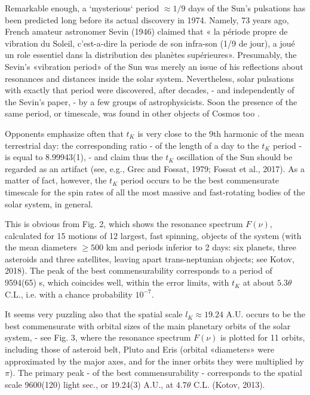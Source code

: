 \documentclass[twoside,draft]{article}
\begin{document}
\begin{sloppypar}
Remarkable enough, a `mysterious` period $\approx 1/9$ days of the Sun's pulsations has been predicted
long before its actual discovery in 1974. Namely, 73 years ago, French amateur astronomer Sevin
(1946) claimed that « la p\'{e}riode propre de vibration du Soleil, c'est-a-dire la periode de son infra-son (1/9 de jour), a jou\'{e} un role essentiel dans la distribution des plan\`{e}tes sup\'{e}rieures». Presumably,
the Sevin's «vibration period» of the Sun was merely an issue of his reflections about resonances
and distances inside the solar system. Nevertheless, solar pulsations with exactly that period were
discovered, after decades, - and independently of the Sevin's paper, - by a few groups of
astrophysicists. Soon the presence of the same period, or timescale, was found in other objects of
Cosmos too \cite{Kotov1}.

Opponents emphasize often that $t_{K}$ is very close to the 9th harmonic of the mean terrestrial day: the corresponding ratio - of the length of a day to the $t_{K}$ period - is equal to 8.99943(1), - and claim
thus the $t_{K}$ oscillation of the Sun should be regarded as an artifact (see, e.g., Grec and Fossat, 1979;
Fossat et al., 2017). As a matter of fact, however, the $t_{K}$ period occurs to be the best commensurate
timescale for the spin rates of all the most massive and fast-rotating bodies of the solar system, in
general.

This is obvious from Fig. 2, which shows the resonance spectrum $F( \nu )$, calculated for 15
motions of 12 largest, fast spinning, objects of the system (with the mean diameters $\geq 500$ km and
periods inferior to 2 days: six planets, three asteroids and three satellites, leaving apart trans-neptunian
objects; see Kotov, 2018). The peak of the best commensurability corresponds to a period of
9594(65) s, which coincides well, within the error limits, with $t_K$ at about $5.3 \theta$ C.L., i.e. with a
chance probability $10^{-7}$.

It seems very puzzling also that the spatial scale $l_{K} \approx 19.24$ A.U. occurs to be the best
commensurate with orbital sizes of the main planetary orbits of the solar system, - see Fig. 3,
where the resonance spectrum $F( \nu )$ is plotted for 11 orbits, including those of asteroid belt, Pluto
and Eris (orbital «diameters» were approximated by the major axes, and for the inner orbits they
were multiplied by $\pi$). The primary peak - of the best commensurability - corresponds to the
spatial scale 9600(120) light sec., or 19.24(3) A.U., at $4.7 \theta$ C.L. (Kotov, 2013).


\end{sloppypar}
\end{document}
